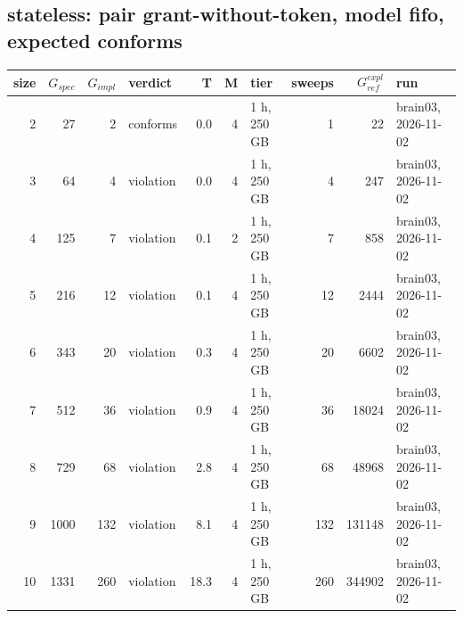 \documentclass[10pt]{article}
\begin{document}
\subsection*{stateless: pair \textsf{grant-without-token}, model fifo, expected conforms}
\begin{longtable}{@{}rrrlrrlrrl@{}}
\toprule
size & $G_{\mathit{spec}}$ & $G_{\mathit{impl}}$ & verdict & T & M & tier & sweeps & $G_{\mathit{ref}}^{\mathit{expl}}$ & run \\
\midrule
\endhead
\color{blue} 2 & 27 & 2 & conforms & 0.0 & 4 & 1 h, 250 GB & 1 & 22 & brain03, 2026-11-02 \\
\color{blue} 3 & 64 & 4 & violation & 0.0 & 4 & 1 h, 250 GB & 4 & 247 & brain03, 2026-11-02 \\
\color{blue} 4 & 125 & 7 & violation & 0.1 & 2 & 1 h, 250 GB & 7 & 858 & brain03, 2026-11-02 \\
\color{blue} 5 & 216 & 12 & violation & 0.1 & 4 & 1 h, 250 GB & 12 & 2444 & brain03, 2026-11-02 \\
\color{blue} 6 & 343 & 20 & violation & 0.3 & 4 & 1 h, 250 GB & 20 & 6602 & brain03, 2026-11-02 \\
\color{blue} 7 & 512 & 36 & violation & 0.9 & 4 & 1 h, 250 GB & 36 & 18024 & brain03, 2026-11-02 \\
\color{blue} 8 & 729 & 68 & violation & 2.8 & 4 & 1 h, 250 GB & 68 & 48968 & brain03, 2026-11-02 \\
\color{blue} 9 & 1000 & 132 & violation & 8.1 & 4 & 1 h, 250 GB & 132 & 131148 & brain03, 2026-11-02 \\
\color{blue} 10 & 1331 & 260 & violation & 18.3 & 4 & 1 h, 250 GB & 260 & 344902 & brain03, 2026-11-02 \\
\bottomrule
\end{longtable}
\end{document}
